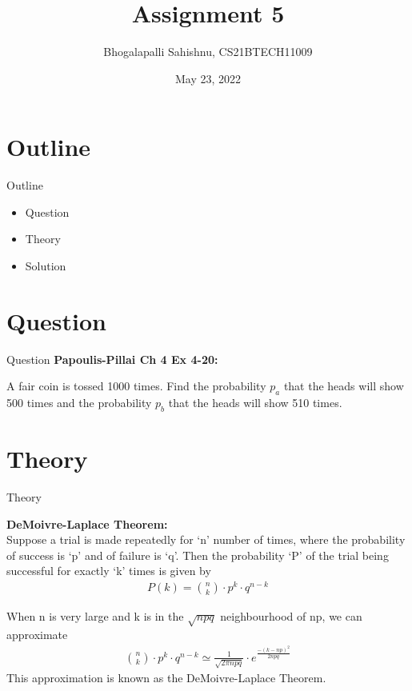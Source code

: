 \documentclass{beamer}
\title{Assignment 5}
\author{Bhogalapalli Sahishnu, CS21BTECH11009}
\date{May 23, 2022}
\begin{document}
\begin{frame}
    \titlepage
\end{frame}

\section{Outline}
\begin{frame}{Outline}
    \begin{itemize}
        \item Question
        \item Theory
        \item Solution
    \end{itemize}
\end{frame}

\section{Question}
\begin{frame}{Question}
    \textbf{Papoulis-Pillai Ch 4 Ex 4-20: }

A fair coin is tossed 1000 times. Find the probability $p_a$ that the heads will show 500 times and the probability $p_b$ that the heads will show 510 times.
\end{frame}

\section{Theory}
\begin{frame}{Theory}

\textbf{DeMoivre-Laplace Theorem: }\\
Suppose a trial is made repeatedly for `n' number of times, where the probability of success is `p' and of failure is `q'. Then the probability `P' of the trial being successful for exactly `k' times is given by
\begin{align}
    P(k) = {n \choose k} \cdot p^{k} \cdot q^{n-k}
\end{align}

When n is very large and k is in the $\sqrt{npq}$ neighbourhood of np, we can approximate
\begin{align}
    {n \choose k} \cdot p^k \cdot q^{n-k} \simeq \frac{1}{\sqrt{2 \pi npq}} \cdot e^{\frac{-(k-np)^2}{2npq}}
\end{align}
This approximation is known as the DeMoivre-Laplace Theorem.
\end{frame}
\end{document}
